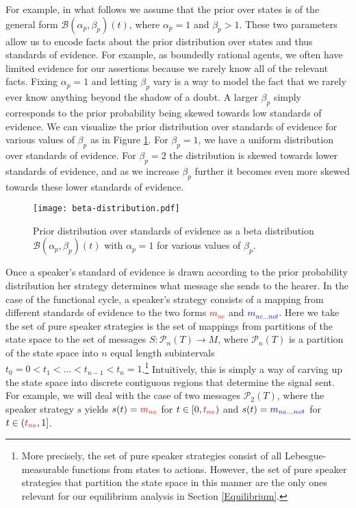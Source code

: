 \documentclass[linguex]{sp}
\theoremstyle{definition} \newtheorem{definition}{Definition}
\begin{document}
For example, in what follows we assume that the prior over states is of the general form $\mathcal{B}(\alpha_p,\beta_p)(t)$, where $\alpha_p = 1$ and $\beta_p > 1$. These two parameters allow us to encode facts about the prior distribution over states and thus standards of evidence. For example, as boundedly rational agents, we often have limited evidence for our assertions because we rarely know all of the relevant facts. Fixing $\alpha_p=1$ and letting $\beta_p$ vary is a way to model the fact that we rarely ever know anything beyond the shadow of a doubt.  A larger $\beta_p$ simply corresponds to the prior probability being skewed towards low standards of evidence.   We can visualize the prior distribution over standards of evidence for various values of $\beta_p$ as in Figure \ref{beta}. For $\beta_p = 1$, we have a uniform distribution over standards of evidence. For $\beta_p = 2$ the distribution is skewed towards lower standards of evidence, and as we increase $\beta_p$ further it becomes even more skewed towards these lower standards of evidence. 

\begin{figure}
\begin{center}
	\texttt{[image: beta-distribution.pdf]}
	\caption{Prior distribution over standards of evidence as a beta distribution $\mathcal{B}(\alpha_p, \beta_p)(t)$  with $\alpha_p = 1$ for various values of $\beta_p$.}
	\label{beta}
\end{center}
\end{figure}

Once a speaker's standard of evidence is drawn according to the prior probability distribution her strategy determines what message she sends to the hearer. In the case of the functional cycle, a speaker's strategy consists of a mapping from different standards of evidence to the two forms \emph{\textcolor{red}{$m_{ne}$}} and \emph{\textcolor{blue}{$m_{ne...not}$}}.  Here we take the set of pure speaker strategies is the set of mappings from partitions of the state space to the set of messages $S : \mathcal{P}_n(T) \rightarrow M$, where $\mathcal{P}_n(T)$ is a partition of the state space into $n$ equal length subintervals $t_0 = 0 < t_1 < ... < t_{n-1} < t_n = 1$.\footnote{More precisely, the set of pure speaker strategies consist of all Lebesgue-measurable functions from states to actions. However, the set of pure speaker strategies that partition the state space in this manner are the only ones relevant for our equilibrium analysis in Section \ref{Equilibrium}.}  Intuitively, this is simply a way of carving up the state space into discrete contiguous regions that determine the signal sent.  For example, we will deal with the case of two messages $\mathcal{P}_2(T)$, where the speaker  strategy $s$ yields $s(t) = \textcolor{red}{m_{ne}}$ for $t \in [0, \emph{\textcolor{red}{$t_{ne}$}})$ and $s(t) = \textcolor{blue}{m_{ne...not}}$  for $t \in (\emph{\textcolor{red}{$t_{ne}$}}, 1]$.  
\end{document}
